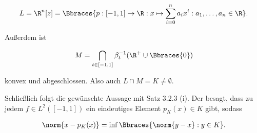 \begin{solution}
\begin{align*}
  L =
  \R^n[z] =
  \Bbraces
  {
    p: [-1, 1] \to \R:
    x \mapsto \sum_{i = 0}^n a_ix^i:
    a_1, \ldots, a_n \in \R
  }.
\end{align*}

Außerdem ist

\begin{align*}
  M =
  \bigcap_{t \in [-1, 1]} \beta_t^{-1}(\R^+ \cup \Bbraces{0})
\end{align*}

konvex und abgeschlossen.
Also auch $L \cap M = K \neq \emptyset$.


Schließlich folgt die gewünschte Aussage mit Satz 3.2.3 (i).
Der besagt, dass zu jedem $f \in L^2([-1, 1])$ ein eindeutiges Element $p_K(x) \in K$ gibt, sodass

\begin{align*}
  \norm{x - p_K(x)}
  =
  \inf \Bbraces{\norm{y - x}: y \in K}.
\end{align*}

\end{solution}
